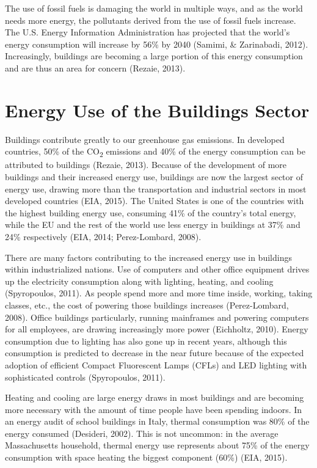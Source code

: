   \par The use of fossil fuels is damaging the world in multiple ways, and as the world needs more energy, the pollutants derived from the use of fossil fuels increase. The U.S. Energy Information Administration has projected that the world's energy consumption will increase by 56\% by 2040 (Samimi, \& Zarinabadi, 2012). Increasingly, buildings are becoming a large portion of this energy consumption and are thus an area for concern (Rezaie, 2013).

  \section{Energy Use of the Buildings Sector}
  \par Buildings contribute greatly to our greenhouse gas emissions. In developed countries, 50\% of the CO\textsubscript{2} emissions and 40\% of the energy consumption can be attributed to buildings (Rezaie, 2013). Because of the development of more buildings and their increased energy use, buildings are now the largest sector of energy use, drawing more than the transportation and industrial sectors in most developed countries (EIA, 2015). The United States is one of the countries with the highest building energy use, consuming 41\% of the country's total energy, while the EU and the rest of the world use less energy in buildings at 37\% and 24\% respectively (EIA, 2014; Perez-Lombard, 2008). 
  \par There are many factors contributing to the increased energy use in buildings within industrialized nations. Use of computers and other office equipment drives up the electricity consumption along with lighting, heating, and cooling (Spyropoulos, 2011). As people spend more and more time inside, working, taking classes, etc., the cost of powering those buildings increases (Perez-Lombard, 2008). Office buildings particularly, running mainframes and powering computers for all employees, are drawing increasingly more power (Eichholtz, 2010). Energy consumption due to lighting has also gone up in recent years, although this consumption is predicted to decrease in the near future because of the expected adoption of efficient Compact Fluorescent Lamps (CFLs) and LED lighting with sophisticated controls (Spyropoulos, 2011).
  \par Heating and cooling are large energy draws in most buildings and are becoming more necessary with the amount of time people have been spending indoors. In an energy audit of school buildings in Italy, thermal consumption was 80\% of the energy consumed (Desideri, 2002). This is not uncommon: in the average Massachusetts household, thermal energy use represents about 75\% of the energy consumption with space heating the biggest component (60\%) (EIA, 2015).
